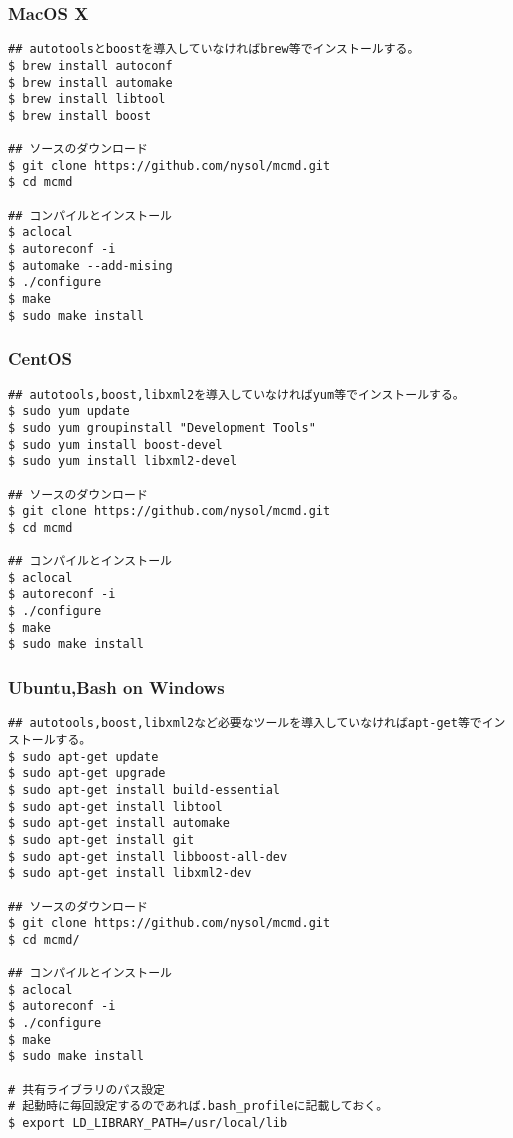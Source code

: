 \subsubsection{MacOS X\\} %


\begin{Verbatim}[baselinestretch=0.7,frame=single]
## autotoolsとboostを導入していなければbrew等でインストールする。
$ brew install autoconf
$ brew install automake
$ brew install libtool
$ brew install boost

## ソースのダウンロード
$ git clone https://github.com/nysol/mcmd.git
$ cd mcmd

## コンパイルとインストール
$ aclocal
$ autoreconf -i
$ automake --add-mising
$ ./configure
$ make
$ sudo make install
\end{Verbatim}

\subsubsection{CentOS\\}

\begin{Verbatim}[baselinestretch=0.7,frame=single]
## autotools,boost,libxml2を導入していなければyum等でインストールする。
$ sudo yum update
$ sudo yum groupinstall "Development Tools"
$ sudo yum install boost-devel
$ sudo yum install libxml2-devel

## ソースのダウンロード
$ git clone https://github.com/nysol/mcmd.git
$ cd mcmd

## コンパイルとインストール
$ aclocal
$ autoreconf -i
$ ./configure
$ make
$ sudo make install
\end{Verbatim}

\subsubsection{Ubuntu,Bash on Windows\\}

\begin{Verbatim}[baselinestretch=0.7,frame=single]
## autotools,boost,libxml2など必要なツールを導入していなければapt-get等でインストールする。
$ sudo apt-get update
$ sudo apt-get upgrade
$ sudo apt-get install build-essential
$ sudo apt-get install libtool
$ sudo apt-get install automake
$ sudo apt-get install git
$ sudo apt-get install libboost-all-dev
$ sudo apt-get install libxml2-dev

## ソースのダウンロード
$ git clone https://github.com/nysol/mcmd.git
$ cd mcmd/

## コンパイルとインストール
$ aclocal
$ autoreconf -i
$ ./configure 
$ make
$ sudo make install

# 共有ライブラリのパス設定
# 起動時に毎回設定するのであれば.bash_profileに記載しておく。
$ export LD_LIBRARY_PATH=/usr/local/lib
\end{Verbatim}

